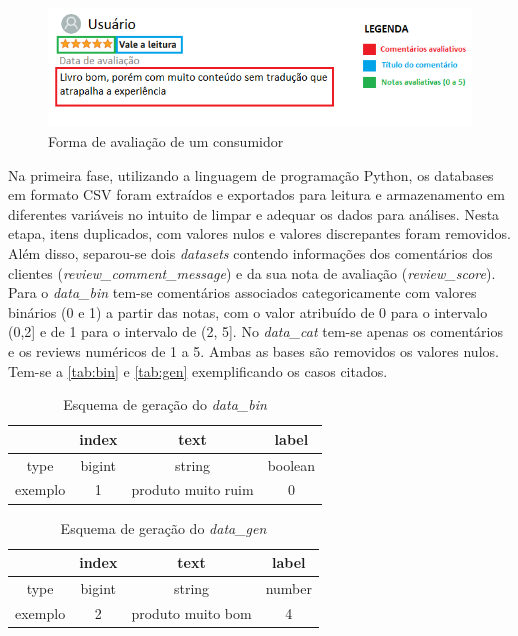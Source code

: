 \begin{figure}[H]
    \centering
    \includegraphics{./figs/review_ex.png}
    \caption{Forma de avaliação de um consumidor}
    \label{fig:review_ex}
\end{figure}


Na primeira fase, utilizando a linguagem de programação Python, os databases em formato CSV foram extraídos e exportados para leitura e armazenamento em diferentes variáveis no intuito de limpar e adequar os dados para análises. Nesta etapa, itens duplicados, com valores nulos e valores discrepantes foram removidos. Além disso, separou-se dois \textit{datasets} contendo informações dos comentários dos clientes (\textit{review\_comment\_message}) e da sua nota de avaliação (\textit{review\_score}). Para o \textit{data\_bin} tem-se comentários associados categoricamente com valores binários (0 e 1) a partir das notas, com o valor atribuído de 0 para o intervalo (0,2] e de 1 para o intervalo de (2, 5]. No \textit{data\_cat} tem-se apenas os comentários e os reviews numéricos de 1 a 5. Ambas as bases são removidos os valores nulos. Tem-se a \autoref{tab:bin} e \autoref{tab:gen} exemplificando os casos citados.


\begin{table}[H]
    \centering
    \begin{tabular}{cccc}
                & index  & text               & label   \\\hline\hline
        type    & bigint & string             & boolean \\\hline
        exemplo & 1      & produto muito ruim & 0
    \end{tabular}
    \caption{Esquema de geração do \textit{data\_bin}}
    \label{tab:bin}
\end{table}

\begin{table}[H]
    \centering
    \begin{tabular}{cccc}
                & index  & text              & label  \\\hline\hline
        type    & bigint & string            & number \\\hline
        exemplo & 2      & produto muito bom & 4
    \end{tabular}
    \caption{Esquema de geração do \textit{data\_gen}}
    \label{tab:gen}
\end{table}


